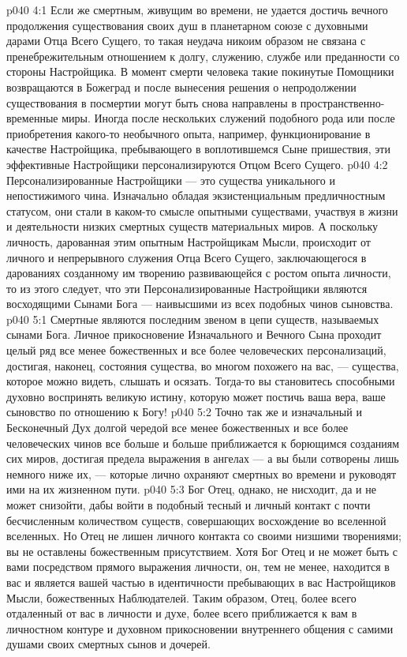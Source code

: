 \vs p040 4:1 Если же смертным, живущим во времени, не удается достичь вечного продолжения существования своих душ в планетарном союзе с духовными дарами Отца Всего Сущего, то такая неудача никоим образом не связана с пренебрежительным отношением к долгу, служению, службе или преданности со стороны Настройщика. В момент смерти человека такие покинутые Помощники возвращаются в Божеград и после вынесения решения о непродолжении существования в посмертии могут быть снова направлены в пространственно\hyp{}временные миры. Иногда после нескольких служений подобного рода или после приобретения какого\hyp{}то необычного опыта, например, функционирование в качестве Настройщика, пребывающего в воплотившемся Сыне пришествия, эти эффективные Настройщики персонализируются Отцом Всего Сущего.
\vs p040 4:2 Персонализированные Настройщики --- это существа уникального и непостижимого чина. Изначально обладая экзистенциальным предличностным статусом, они стали в каком\hyp{}то смысле опытными существами, участвуя в жизни и деятельности низких смертных существ материальных миров. А поскольку личность, дарованная этим опытным Настройщикам Мысли, происходит от личного и непрерывного служения Отца Всего Сущего, заключающегося в дарованиях созданному им творению развивающейся с ростом опыта личности, то из этого следует, что эти Персонализированные Настройщики являются восходящими Сынами Бога --- наивысшими из всех подобных чинов сыновства.
\vs p040 5:1 Смертные являются последним звеном в цепи существ, называемых сынами Бога. Личное прикосновение Изначального и Вечного Сына проходит целый ряд все менее божественных и все более человеческих персонализаций, достигая, наконец, состояния существа, во многом похожего на вас, --- существа, которое можно видеть, слышать и осязать. Тогда\hyp{}то вы становитесь способными духовно воспринять великую истину, которую может постичь ваша вера, ваше сыновство по отношению к Богу!
\vs p040 5:2 Точно так же и изначальный и Бесконечный Дух долгой чередой все менее божественных и все более человеческих чинов все больше и больше приближается к борющимся созданиям сих миров, достигая предела выражения в ангелах --- а вы были сотворены лишь немного ниже их, --- которые лично охраняют смертных во времени и руководят ими на их жизненном пути.
\vs p040 5:3 Бог Отец, однако, не нисходит, да и не может снизойти, дабы войти в подобный тесный и личный контакт с почти бесчисленным количеством существ, совершающих восхождение во вселенной вселенных. Но Отец не лишен личного контакта со своими низшими творениями; вы не оставлены божественным присутствием. Хотя Бог Отец и не может быть с вами посредством прямого выражения личности, он, тем не менее, находится в вас и является вашей частью в идентичности пребывающих в вас Настройщиков Мысли, божественных Наблюдателей. Таким образом, Отец, более всего отдаленный от вас в личности и духе, более всего приближается к вам в личностном контуре и духовном прикосновении внутреннего общения с самими душами своих смертных сынов и дочерей.
